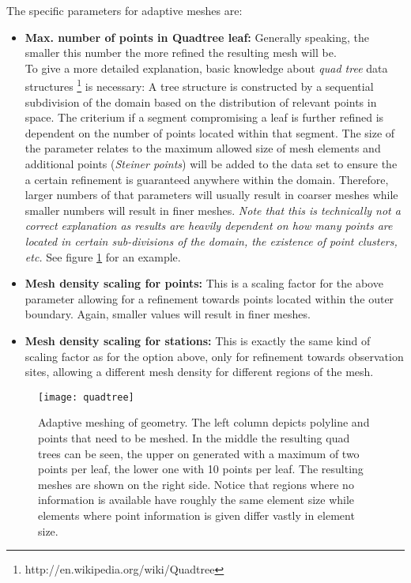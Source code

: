 The specific parameters for adaptive meshes are:
\begin{itemize}
\item \textbf{Max. number of points in Quadtree leaf:} Generally speaking, the smaller this number the more refined the resulting mesh will be. \\
    To give a more detailed explanation, basic knowledge about \emph{quad tree} data structures \footnote{http://en.wikipedia.org/wiki/Quadtree} is necessary: A tree structure is constructed by a sequential subdivision of the domain based on the distribution of relevant points in space. The criterium if a segment compromising a leaf is further refined is dependent on the number of points located within that segment. The size of the parameter relates to the maximum allowed size of mesh elements and additional points (\emph{Steiner points}) will be added to the data set to ensure the a certain refinement is guaranteed anywhere within the domain. Therefore, larger numbers of that parameters will usually result in coarser meshes while smaller numbers will result in finer meshes. \emph{Note that this is technically not a correct explanation as results are heavily dependent on how many points are located in certain sub-divisions of the domain, the existence of point clusters, etc.} See figure \ref{fig:quadtree} for an example.
\item \textbf{Mesh density scaling for points:} This is a scaling factor for the above parameter allowing for a refinement towards points located within the outer boundary. Again, smaller values will result in finer meshes.
\item \textbf{Mesh density scaling for stations:} This is exactly the same kind of scaling factor as for the option above, only for refinement towards observation sites, allowing a different mesh density for different regions of the mesh.
\end{itemize}

\begin{figure}[tb]
\begin{center}
\texttt{[image: quadtree]}\label{quadtree}
\end{center}
\caption{Adaptive meshing of geometry. The left column depicts polyline and points that need to be meshed. In the middle the resulting quad trees can be seen, the upper on generated with a maximum of two points per leaf, the lower one with 10 points per leaf. The resulting meshes are shown on the right side. Notice that regions where no information is available have roughly the same element size while elements where point information is given differ vastly in element size.} \label{fig:quadtree}
\end{figure}

